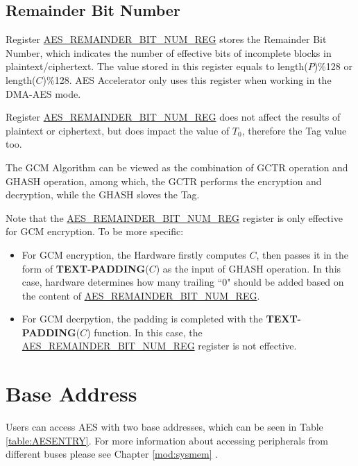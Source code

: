 \documentclass[main\_\_EN.tex]{subfiles}
\begin{document}
\subsection{ Remainder Bit Number}\label{Label Remainder Bit Number}

Register \hyperref[regdesc:AESREMAINDERBITNUMREG]{AES\_REMAINDER\_BIT\_NUM\_REG} stores the Remainder Bit Number, which indicates the number of effective bits of incomplete blocks in plaintext/ciphertext. The value stored in this register equals to length($P$)\%128 or length($C$)\%128. AES Accelerator only uses this register when working in the DMA-AES mode.

Register \hyperref[regdesc:AESREMAINDERBITNUMREG]{AES\_REMAINDER\_BIT\_NUM\_REG} does not affect the results of plaintext or ciphertext, but does impact the value of $T_{0}$, therefore the Tag value too.

The GCM Algorithm can be viewed as the combination of GCTR operation and GHASH operation, among which, the GCTR performs the encryption and decryption, while the GHASH sloves the Tag.

Note that the \hyperref[regdesc:AESREMAINDERBITNUMREG]{AES\_REMAINDER\_BIT\_NUM\_REG} register is only effective for GCM encryption. To be more specific:

\begin{itemize}
    \item For GCM encryption, the Hardware firstly computes $C$, then passes it in the form of {\bfseries TEXT-PADDING}($C$) as the input of GHASH operation. In this case, hardware determines how many trailing ``0" should be added based on the content of \hyperref[regdesc:AESREMAINDERBITNUMREG]{AES\_REMAINDER\_BIT\_NUM\_REG}.
    \item For GCM decrpytion, the padding is completed with the {\bfseries TEXT-PADDING}($C$) function. In this case, the \hyperref[regdesc:AESREMAINDERBITNUMREG]{AES\_REMAINDER\_BIT\_NUM\_REG} register is not effective.
\end{itemize}


\section{ Base Address } \label{Label AES MODULE ENTRY}

Users can access AES with two base addresses, which can be seen in Table \ref{table:AESENTRY}. For more information about accessing peripherals from different buses please see Chapter \ref{mod:sysmem} \textit{}.\\
\end{document}
